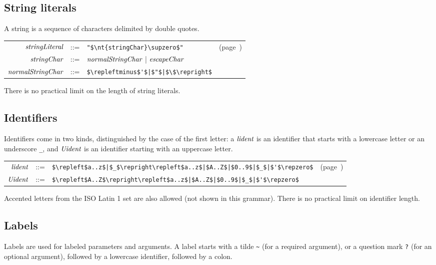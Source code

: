 \subsection{String literals}

A string is a sequence of characters delimited by double quotes.

\begin{center}
\begin{tabular}{rcll}
$\textit{\rmfamily stringLiteral}$ & ::= & \hbox{\lstinline/"$\nt{stringChar}\supzero$"/} & (page~\pageref{literal:string})\\
$\textit{\rmfamily stringChar}$ & ::= & $\textit{\rmfamily normalStringChar}$ | $\textit{\rmfamily escapeChar}$\\
$\textit{\rmfamily normalStringChar}$ & ::= & \hbox{\lstinline/$\repleftminus$'$|$"$|$\$\repright$/}%
\end{tabular}
\end{center}
%
There is no practical limit on the length of string literals.

\subsection{Identifiers}

Identifiers come in two kinds, distinguished by the case of the first letter: a $\textit{\rmfamily lident}$ is an
identifier that starts with a lowercase letter or an underscore \hbox{\lstinline/_/}, and $\textit{\rmfamily Uident}$ is
an identifier starting with an uppercase letter.

\begin{center}
\begin{tabular}{rcll}
$\textit{\rmfamily lident}$ & ::= & \hbox{\lstinline/$\repleft$a..z$|$_$\repright\repleft$a..z$|$A..Z$|$0..9$|$_$|$'$\repzero$/} & (page~\pageref{literal:lident})\\
$\textit{\rmfamily Uident}$ & ::= & \hbox{\lstinline/$\repleft$A..Z$\repright\repleft$a..z$|$A..Z$|$0..9$|$_$|$'$\repzero$/}
\end{tabular}
\end{center}
%
Accented letters from the ISO Latin 1 set are also allowed (not shown in this grammar).  There is no
practical limit on identifier length.

\subsection{Labels}

Labels are used for labeled parameters and arguments.  A label starts with a tilde \hbox{\lstinline/~/}
(for a required argument), or a question mark \hbox{\lstinline/?/} (for an optional argument), followed
by a lowercase identifier, followed by a colon.

